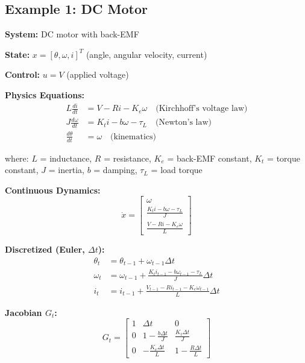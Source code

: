 \subsection{Example 1: DC Motor}

\begin{tcolorbox}[colback=blue!5!white,colframe=blue!75!black,title=DC Motor Dynamics]

\textbf{System:} DC motor with back-EMF

\textbf{State:} $x = [\theta, \omega, i]^T$ (angle, angular velocity, current)

\textbf{Control:} $u = V$ (applied voltage)

\textbf{Physics Equations:}
\begin{align}
L\frac{di}{dt} &= V - Ri - K_e \omega \quad \text{(Kirchhoff's voltage law)} \\
J\frac{d\omega}{dt} &= K_t i - b\omega - \tau_L \quad \text{(Newton's law)} \\
\frac{d\theta}{dt} &= \omega \quad \text{(kinematics)}
\end{align}

where: $L$ = inductance, $R$ = resistance, $K_e$ = back-EMF constant, $K_t$ = torque constant, $J$ = inertia, $b$ = damping, $\tau_L$ = load torque

\textbf{Continuous Dynamics:}
\begin{equation}
\dot{x} = \begin{bmatrix} \omega \\ \frac{K_t i - b\omega - \tau_L}{J} \\ \frac{V - Ri - K_e\omega}{L} \end{bmatrix}
\end{equation}

\textbf{Discretized (Euler, $\Delta t$):}
\begin{align}
\theta_t &= \theta_{t-1} + \omega_{t-1} \Delta t \\
\omega_t &= \omega_{t-1} + \frac{K_t i_{t-1} - b\omega_{t-1} - \tau_L}{J} \Delta t \\
i_t &= i_{t-1} + \frac{V_{t-1} - Ri_{t-1} - K_e\omega_{t-1}}{L} \Delta t
\end{align}

\textbf{Jacobian $G_t$:}
\begin{equation}
G_t = \begin{bmatrix}
1 & \Delta t & 0 \\[5pt]
0 & 1 - \frac{b\Delta t}{J} & \frac{K_t \Delta t}{J} \\[5pt]
0 & -\frac{K_e \Delta t}{L} & 1 - \frac{R\Delta t}{L}
\end{bmatrix}
\end{equation}


\end{tcolorbox}
